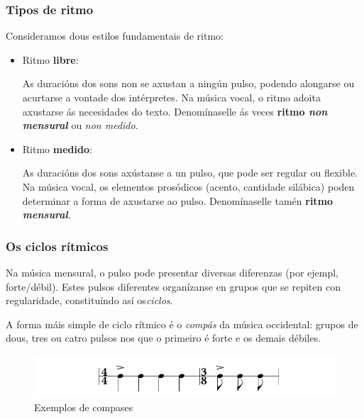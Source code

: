 \documentclass[spanish, a4paper,nobind]{templates/ociamthesis}
\begin{document}
\hypertarget{tipos-de-ritmo}{%
\subsubsection*{Tipos de ritmo}\label{tipos-de-ritmo}}

Consideramos dous estilos fundamentais de ritmo:

\begin{itemize}
\item
  Ritmo \textbf{libre}:

  As duracións dos sons non se axustan a ningún pulso, podendo alongarse ou acurtarse a vontade dos intérpretes. Na música vocal, o ritmo adoita axustarse ás necesidades do texto. Denomínaselle ás veces \textbf{ritmo \emph{non mensural}} ou \emph{non medido}.
\item
  Ritmo \textbf{medido}:

  As duracións dos sons axústanse a un pulso, que pode ser regular ou flexible. Na música vocal, os elementos prosódicos (acento, cantidade silábica) poden determinar a forma de axustarse ao pulso. Denomínaselle tamén \textbf{ritmo \emph{mensural}}.
\end{itemize}

\hypertarget{os-ciclos-ruxedtmicos}{%
\subsubsection*{Os ciclos rítmicos}\label{os-ciclos-ruxedtmicos}}

Na música mensural, o pulso pode presentar diversas diferenzas (por ejempl, forte/débil). Estes pulsos diferentes organízanse en grupos que se repiten con regularidade, constituíndo así os\emph{ciclos}.

A forma máis simple de ciclo rítmico é o \emph{compás} da música occidental: grupos de dous, tres ou catro pulsos nos que o primeiro é forte e os demais débiles.

\begin{figure}
\centering
\includegraphics{figures/ud-03/compases.png}
\caption{Exemplos de compases}
\end{figure}
\end{document}

